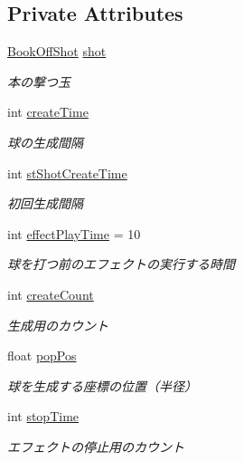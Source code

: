 \subsection*{Private Attributes}
\begin{DoxyCompactItemize}
\item 
\hyperlink{class_book_off_shot}{Book\+Off\+Shot} \hyperlink{class_book_a6bdde0825229953d0ca01c5f8155640c}{shot}
\begin{DoxyCompactList}\small\item\em 本の撃つ玉 \end{DoxyCompactList}\item 
int \hyperlink{class_book_a5a72ee51241bfe497c5ec37cca7e93b0}{create\+Time}
\begin{DoxyCompactList}\small\item\em 球の生成間隔 \end{DoxyCompactList}\item 
int \hyperlink{class_book_a132afd5c2381c6b72abb611b29e9cecc}{st\+Shot\+Create\+Time}
\begin{DoxyCompactList}\small\item\em 初回生成間隔 \end{DoxyCompactList}\item 
int \hyperlink{class_book_ad61980db8afccccb6166f620f90551f9}{effect\+Play\+Time} = 10
\begin{DoxyCompactList}\small\item\em 球を打つ前のエフェクトの実行する時間 \end{DoxyCompactList}\item 
int \hyperlink{class_book_af625fb16f0bc669f6ccc9547d8577ee8}{create\+Count}
\begin{DoxyCompactList}\small\item\em 生成用のカウント \end{DoxyCompactList}\item 
float \hyperlink{class_book_a4e63db3a3e3999e1ccaf01b9678182e7}{pop\+Pos}
\begin{DoxyCompactList}\small\item\em 球を生成する座標の位置（半径） \end{DoxyCompactList}\item 
int \hyperlink{class_book_abb3b0df54a256fdd22ca78d1806772d1}{stop\+Time}
\begin{DoxyCompactList}\small\item\em エフェクトの停止用のカウント \end{DoxyCompactList}\item 

\end{DoxyCompactItemize}
